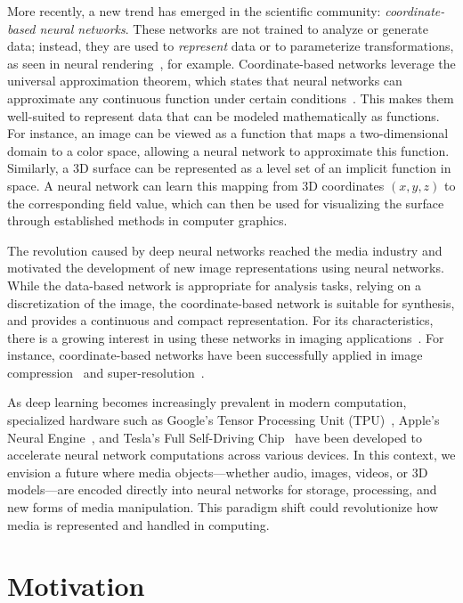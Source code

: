More recently, a new trend has emerged in the scientific community: \textit{coordinate-based neural networks}. These networks are not trained to analyze or generate data; instead, they are used to \textit{represent} data or to parameterize transformations, as seen in neural rendering~\citep{starNeuralRendering22}, for example. Coordinate-based networks leverage the universal approximation theorem, which states that neural networks can approximate any continuous function under certain conditions~\citep{HORNIK1989359,cybenko89}. This makes them well-suited to represent data that can be modeled mathematically as functions. For instance, an image can be viewed as a function that maps a two-dimensional domain to a color space, allowing a neural network to approximate this function. Similarly, a 3D surface can be represented as a level set of an implicit function in space. A neural network can learn this mapping from 3D coordinates \((x, y, z)\) to the corresponding field value, which can then be used for visualizing the surface through established methods in computer graphics.

The revolution caused by deep neural networks reached the media industry and motivated the development of new image representations using neural networks. While the data-based network is appropriate for analysis tasks, relying on a discretization of the image, the coordinate-based network is suitable for synthesis, and provides a continuous and compact representation. For its characteristics, there is a growing interest in using these networks in imaging applications~\citep{xie2022neural}. For instance, coordinate-based networks have been successfully applied in image compression~\citep{dupont2021coin} and super-resolution~\citep{czerkawski2021neural}.

As deep learning becomes increasingly prevalent in modern computation, specialized hardware such as Google's Tensor Processing Unit (TPU)~\citep{googleTPU}, Apple's Neural Engine~\citep{appleNeural}, and Tesla's Full Self-Driving Chip~\citep{Talpes2020Tesla} have been developed to accelerate neural network computations across various devices. In this context, we envision a future where media objects—whether audio, images, videos, or 3D models—are encoded directly into neural networks for storage, processing, and new forms of media manipulation. This paradigm shift could revolutionize how media is represented and handled in computing.


\section{Motivation}

